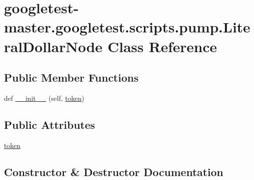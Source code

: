 \hypertarget{classgoogletest-master_1_1googletest_1_1scripts_1_1pump_1_1_literal_dollar_node}{}\section{googletest-\/master.googletest.\+scripts.\+pump.\+Literal\+Dollar\+Node Class Reference}
\label{classgoogletest-master_1_1googletest_1_1scripts_1_1pump_1_1_literal_dollar_node}
\subsection*{Public Member Functions}
\begin{DoxyCompactItemize}
\item 
def \mbox{\hyperlink{classgoogletest-master_1_1googletest_1_1scripts_1_1pump_1_1_literal_dollar_node_aa63a7fd90f3ca3e2ee48eb554865ee3d}{\+\_\+\+\_\+init\+\_\+\+\_\+}} (self, \mbox{\hyperlink{classgoogletest-master_1_1googletest_1_1scripts_1_1pump_1_1_literal_dollar_node_a389f82743b7f7d4846f45ea1926439dc}{token}})
\end{DoxyCompactItemize}
\subsection*{Public Attributes}
\begin{DoxyCompactItemize}
\item 
\mbox{\hyperlink{classgoogletest-master_1_1googletest_1_1scripts_1_1pump_1_1_literal_dollar_node_a389f82743b7f7d4846f45ea1926439dc}{token}}
\end{DoxyCompactItemize}


\subsection{Constructor \& Destructor Documentation}
\mbox{\label{classgoogletest-master_1_1googletest_1_1scripts_1_1pump_1_1_literal_dollar_node_aa63a7fd90f3ca3e2ee48eb554865ee3d}} 
